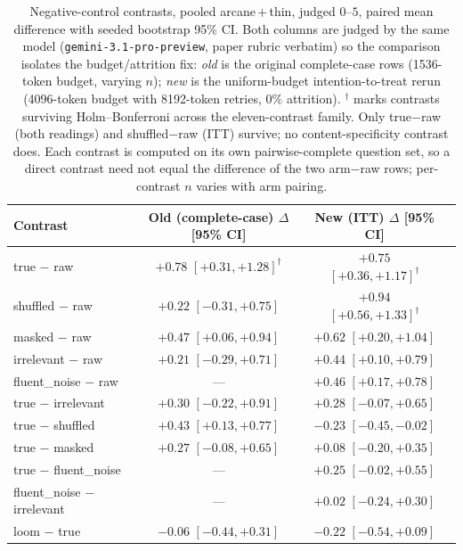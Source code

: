 \documentclass[10pt,twocolumn]{article}
\begin{document}
\begin{table}[t]\centering\small
\caption{Negative-control contrasts, pooled arcane\,$+$\,thin, judged $0$--$5$, paired mean difference
with seeded bootstrap 95\% CI. Both columns are judged by the same model (\texttt{gemini-3.1-pro-preview},
paper rubric verbatim) so the comparison isolates the budget/attrition fix: \emph{old} is the original
complete-case rows (1536-token budget, varying $n$); \emph{new} is the uniform-budget intention-to-treat
rerun (4096-token budget with 8192-token retries, $0\%$ attrition). $^{\dagger}$ marks contrasts surviving
Holm--Bonferroni across the eleven-contrast family. Only true$-$raw (both readings) and shuffled$-$raw
(ITT) survive; no content-specificity contrast does. Each contrast is computed on its own
pairwise-complete question set, so a direct contrast need not equal the difference of the two
arm$-$raw rows; per-contrast $n$ varies with arm pairing.}
\label{tab:controls}
\begin{tabular}{lccc}
\toprule
Contrast & Old (complete-case) $\Delta$ [95\% CI] & New (ITT) $\Delta$ [95\% CI] \\
\midrule
true $-$ raw              & $+0.78$ $[+0.31,+1.28]^{\dagger}$ & $+0.75$ $[+0.36,+1.17]^{\dagger}$ \\
shuffled $-$ raw          & $+0.22$ $[-0.31,+0.75]$          & $+0.94$ $[+0.56,+1.33]^{\dagger}$ \\
masked $-$ raw            & $+0.47$ $[+0.06,+0.94]$          & $+0.62$ $[+0.20,+1.04]$ \\
irrelevant $-$ raw        & $+0.21$ $[-0.29,+0.71]$          & $+0.44$ $[+0.10,+0.79]$ \\
fluent\_noise $-$ raw     & ---                              & $+0.46$ $[+0.17,+0.78]$ \\
true $-$ irrelevant       & $+0.30$ $[-0.22,+0.91]$          & $+0.28$ $[-0.07,+0.65]$ \\
true $-$ shuffled         & $+0.43$ $[+0.13,+0.77]$          & $-0.23$ $[-0.45,-0.02]$ \\
true $-$ masked           & $+0.27$ $[-0.08,+0.65]$          & $+0.08$ $[-0.20,+0.35]$ \\
true $-$ fluent\_noise    & ---                              & $+0.25$ $[-0.02,+0.55]$ \\
fluent\_noise $-$ irrelevant & ---                           & $+0.02$ $[-0.24,+0.30]$ \\
loom $-$ true             & $-0.06$ $[-0.44,+0.31]$          & $-0.22$ $[-0.54,+0.09]$ \\
\bottomrule
\end{tabular}
\end{table}
\end{document}

